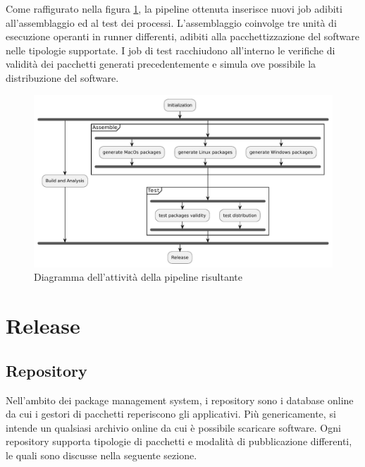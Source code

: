Come raffigurato nella figura \ref{fig:pipeline-activity-diagram}, la pipeline ottenuta inserisce nuovi job adibiti all'assemblaggio ed al test dei processi. L'assemblaggio coinvolge tre unità di esecuzione operanti in runner differenti, adibiti alla pacchettizzazione del software nelle tipologie supportate. I job di test racchiudono all'interno le verifiche di validità dei pacchetti generati precedentemente e simula ove possibile la distribuzione del software.
\begin{figure}[htb]
	\centering
	\includegraphics[width=1\linewidth]{figures/pipeline-result.pdf}
	\caption{Diagramma dell'attività della pipeline risultante}
	\label{fig:pipeline-activity-diagram}
\end{figure}

\newpage
\section{Release}

\subsection{Repository}
Nell'ambito dei package management system, i repository sono i database online da cui i gestori di pacchetti reperiscono gli applicativi. Più genericamente, si intende un qualsiasi archivio online da cui è possibile scaricare software. Ogni repository supporta tipologie di pacchetti e modalità di pubblicazione differenti, le quali sono discusse nella seguente sezione.

